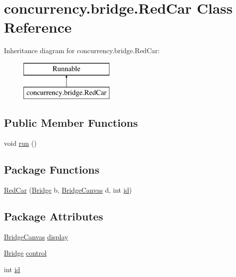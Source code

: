 \hypertarget{classconcurrency_1_1bridge_1_1_red_car}{}\section{concurrency.\+bridge.\+Red\+Car Class Reference}
\label{classconcurrency_1_1bridge_1_1_red_car}
Inheritance diagram for concurrency.\+bridge.\+Red\+Car\+:\begin{figure}[H]
\begin{center}
\leavevmode
\includegraphics[height=2.000000cm]{classconcurrency_1_1bridge_1_1_red_car}
\end{center}
\end{figure}
\subsection*{Public Member Functions}
\begin{DoxyCompactItemize}
\item 
void \mbox{\hyperlink{classconcurrency_1_1bridge_1_1_red_car_a5666214e241536f7ef5f42e0f9ba17da}{run}} ()
\end{DoxyCompactItemize}
\subsection*{Package Functions}
\begin{DoxyCompactItemize}
\item 
\mbox{\hyperlink{classconcurrency_1_1bridge_1_1_red_car_ac5923e9355634afa3d2ecb9ae6bb1a4e}{Red\+Car}} (\mbox{\hyperlink{classconcurrency_1_1bridge_1_1_bridge}{Bridge}} b, \mbox{\hyperlink{classconcurrency_1_1bridge_1_1_bridge_canvas}{Bridge\+Canvas}} d, int \mbox{\hyperlink{classconcurrency_1_1bridge_1_1_red_car_a58bd7fd277a22e90c81bb6d0caa7bed3}{id}})
\end{DoxyCompactItemize}
\subsection*{Package Attributes}
\begin{DoxyCompactItemize}
\item 
\mbox{\hyperlink{classconcurrency_1_1bridge_1_1_bridge_canvas}{Bridge\+Canvas}} \mbox{\hyperlink{classconcurrency_1_1bridge_1_1_red_car_a74921d6c4626acedf0c000703a4c138b}{display}}
\item 
\mbox{\hyperlink{classconcurrency_1_1bridge_1_1_bridge}{Bridge}} \mbox{\hyperlink{classconcurrency_1_1bridge_1_1_red_car_a8f1e50b1058d7f3a2215c064435655e5}{control}}
\item 
int \mbox{\hyperlink{classconcurrency_1_1bridge_1_1_red_car_a58bd7fd277a22e90c81bb6d0caa7bed3}{id}}
\end{DoxyCompactItemize}



